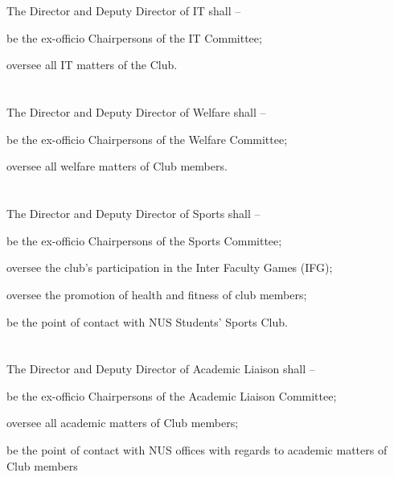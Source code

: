\section{}
The Director and Deputy Director of IT shall –
	\begin{legal}
	\item be the ex-officio Chairpersons of the IT Committee;
	\item oversee all IT matters of the Club.
	\end{legal}

\section{}
The Director and Deputy Director of Welfare shall –
	\begin{legal}
	\item be the ex-officio Chairpersons of the Welfare Committee;
	\item oversee all welfare matters of Club members.
	\end{legal}

\section{}
The Director and Deputy Director of Sports shall –
	\begin{legal}
	\item be the ex-officio Chairpersons of the Sports Committee;
	\item oversee the club's participation in the Inter Faculty Games (IFG);
	\item oversee the promotion of health and fitness of club members;
	\item be the point of contact with NUS Students' Sports Club.
	\end{legal}

\section{}
The Director and Deputy Director of Academic Liaison shall –
	\begin{legal}
	\item be the ex-officio Chairpersons of the Academic Liaison Committee;
	\item oversee all academic matters of Club members;
	\item be the point of contact with NUS offices with regards to academic matters of Club members
	\end{legal}
